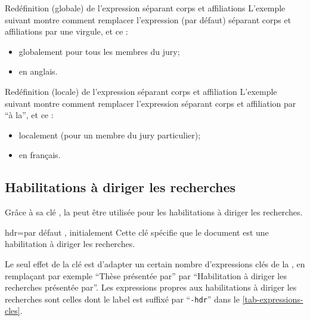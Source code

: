 \begin{dbexample}{Redéfinition (globale) de l'expression séparant corps et
    affiliations}{}
  L'exemple suivant montre comment remplacer l'expression (par défaut) séparant
  corps et affiliations par une virgule, et ce :
  \begin{itemize}
  \item globalement pour tous les membres du jury;
  \item en anglais.
  \end{itemize}
\end{dbexample}

\begin{dbexample}{Redéfinition (locale) de l'expression séparant corps et
    affiliation}{}
  L'exemple suivant montre comment remplacer l'expression séparant corps et
  affiliation par \enquote{\textvisiblespace{}à la\textvisiblespace{}}, et ce :
  \begin{itemize}
  \item localement (pour un membre du jury particulier);
  \item en français.
  \end{itemize}
\begin{bodycode}[listing options={showspaces}]
\end{bodycode}
\end{dbexample}

\subsection{Habilitations à diriger les recherches}
\label{sec-hdr}
%
Grâce à sa clé , la \yatcl{} peut être utilisée pour
les habilitations à diriger les recherches.

\begin{docKey}{hdr}{=\textbar{}}{par défaut
    , initialement }
  Cette clé spécifie que le document est une habilitation à diriger les
  recherches.
\end{docKey}

Le seul effet de la clé  est d'adapter un certain nombre
d'expressions clés de la \yatcl{}, en remplaçant par exemple \enquote{Thèse
  présentée par} par \enquote{Habilitation à diriger les recherches présentée
  par}. Les expressions propres aux habilitations à diriger les recherches sont
celles dont le label est suffixé par \enquote{\texttt{-hdr}} dans le
\vref{tab-expressions-cles}.

